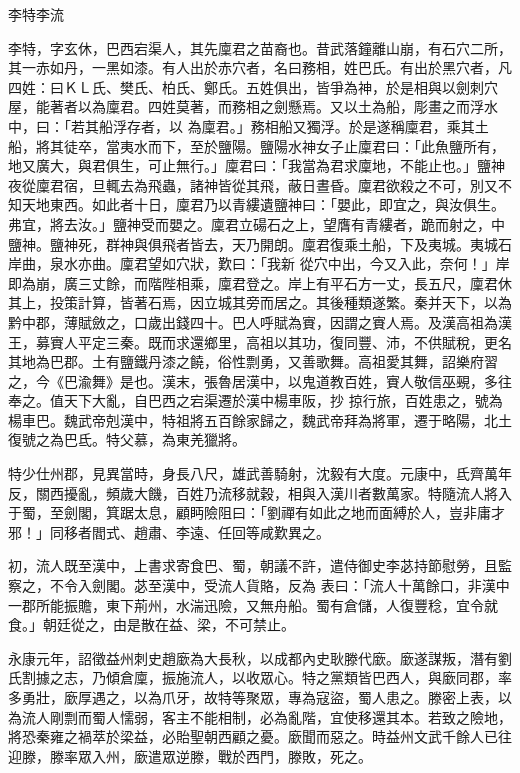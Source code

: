 
\begin{pinyinscope}

 李特李流



 李特，字玄休，巴西宕渠人，其先廩君之苗裔也。昔武落鐘離山崩，有石穴二所，其一赤如丹，一黑如漆。有人出於赤穴者，名曰務相，姓巴氏。有出於黑穴者，凡四姓：曰ＫＬ氏、樊氏、柏氏、鄭氏。五姓俱出，皆爭為神，於是相與以劍刺穴屋，能著者以為廩君。四姓莫著，而務相之劍懸焉。又以土為船，彫畫之而浮水中，曰：「若其船浮存者，以
 為廩君。」務相船又獨浮。於是遂稱廩君，乘其土船，將其徒卒，當夷水而下，至於鹽陽。鹽陽水神女子止廩君曰：「此魚鹽所有，地又廣大，與君俱生，可止無行。」廩君曰：「我當為君求廩地，不能止也。」鹽神夜從廩君宿，旦輒去為飛蟲，諸神皆從其飛，蔽日晝昏。廩君欲殺之不可，別又不知天地東西。如此者十日，廩君乃以青縷遺鹽神曰：「嬰此，即宜之，與汝俱生。弗宜，將去汝。」鹽神受而嬰之。廩君立碭石之上，望膺有青縷者，跪而射之，中鹽神。鹽神死，群神與俱飛者皆去，天乃開朗。廩君復乘土船，下及夷城。夷城石岸曲，泉水亦曲。廩君望如穴狀，歎曰：「我新
 從穴中出，今又入此，奈何！」岸即為崩，廣三丈餘，而階陛相乘，廩君登之。岸上有平石方一丈，長五尺，廩君休其上，投策計算，皆著石焉，因立城其旁而居之。其後種類遂繁。秦并天下，以為黔中郡，薄賦斂之，口歲出錢四十。巴人呼賦為賨，因謂之賨人焉。及漢高祖為漢王，募賨人平定三秦。既而求還鄉里，高祖以其功，復同豐、沛，不供賦稅，更名其地為巴郡。土有鹽鐵丹漆之饒，俗性剽勇，又善歌舞。高祖愛其舞，詔樂府習之，今《巴渝舞》是也。漢末，張魯居漢中，以鬼道教百姓，賨人敬信巫覡，多往奉之。值天下大亂，自巴西之宕渠遷於漢中楊車阪，抄
 掠行旅，百姓患之，號為楊車巴。魏武帝剋漢中，特祖將五百餘家歸之，魏武帝拜為將軍，遷于略陽，北土復號之為巴氐。特父慕，為東羌獵將。



 特少仕州郡，見異當時，身長八尺，雄武善騎射，沈毅有大度。元康中，氐齊萬年反，關西擾亂，頻歲大饑，百姓乃流移就穀，相與入漢川者數萬家。特隨流人將入于蜀，至劍閣，箕踞太息，顧眄險阻曰：「劉禪有如此之地而面縛於人，豈非庸才邪！」同移者閻式、趙肅、李遠、任回等咸歎異之。



 初，流人既至漢中，上書求寄食巴、蜀，朝議不許，遣侍御史李苾持節慰勞，且監察之，不令入劍閣。苾至漢中，受流人貨賂，反為
 表曰：「流人十萬餘口，非漢中一郡所能振贍，東下荊州，水湍迅險，又無舟船。蜀有倉儲，人復豐稔，宜令就食。」朝廷從之，由是散在益、梁，不可禁止。



 永康元年，詔徵益州刺史趙廞為大長秋，以成都內史耿滕代廞。廞遂謀叛，潛有劉氏割據之志，乃傾倉廩，振施流人，以收眾心。特之黨類皆巴西人，與廞同郡，率多勇壯，廞厚遇之，以為爪牙，故特等聚眾，專為寇盜，蜀人患之。滕密上表，以為流人剛剽而蜀人懦弱，客主不能相制，必為亂階，宜使移還其本。若致之險地，將恐秦雍之禍萃於梁益，必貽聖朝西顧之憂。廞聞而惡之。時益州文武千餘人已往
 迎滕，滕率眾入州，廞遣眾逆滕，戰於西門，滕敗，死之。




\end{pinyinscope}
